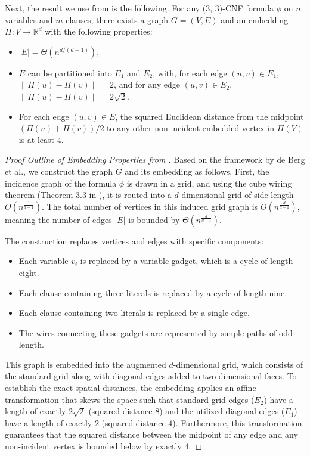 \documentclass[11pt]{article}
\begin{document}
Next, the result we use from \cite{BergBKMZ20} is the following. For any (3, 3)-CNF formula $\phi$ on $n$ variables and $m$ clauses, there exists a graph $G = (V,E)$ and an embedding $\Pi : V \rightarrow \mathbb{R}^d$ with the following properties:
\begin{itemize}
    \item $|E| = \Theta(n^{d/(d-1)})$, 
    \item $E$ can be partitioned into $E_1$ and $E_2$, with, for each edge $(u,v) \in E_1$, $\|\Pi(u) - \Pi(v)\| = 2$, and for any edge $(u, v) \in E_2$, $\|\Pi(u) - \Pi(v)\| = 2\sqrt{2}$.
    \item For each edge $(u,v) \in E$, the squared Euclidean distance from the midpoint $(\Pi(u) + \Pi(v))/2$ to any other non-incident embedded vertex in $\Pi(V)$ is at least $4$.
\end{itemize}

\begin{proof}[Proof Outline of Embedding Properties from \cite{BergBKMZ20}] 
Based on the framework by de Berg et al., we construct the graph $G$ and its embedding as follows. First, the incidence graph of the formula $\phi$ is drawn in a grid, and using the cube wiring theorem (Theorem 3.3 in \cite{BergBKMZ20}), it is routed into a $d$-dimensional grid of side length $O(n^{\frac{1}{d-1}})$. The total number of vertices in this induced grid graph is $O(n^{\frac{d}{d-1}})$, meaning the number of edges $|E|$ is bounded by $\Theta(n^{\frac{d}{d-1}})$. 

The construction replaces vertices and edges with specific components:
\begin{itemize}
    \item Each variable $v_i$ is replaced by a variable gadget, which is a cycle of length eight.
    \item Each clause containing three literals is replaced by a cycle of length nine.
    \item Each clause containing two literals is replaced by a single edge.
    \item The wires connecting these gadgets are represented by simple paths of odd length.
\end{itemize}

This graph is embedded into the augmented $d$-dimensional grid, which consists of the standard grid along with diagonal edges added to two-dimensional faces. To establish the exact spatial distances, the embedding applies an affine transformation that skews the space such that standard grid edges ($E_2$) have a length of exactly $2\sqrt{2}$ (squared distance $8$) and the utilized diagonal edges ($E_1$) have a length of exactly $2$ (squared distance $4$). Furthermore, this transformation guarantees that the squared distance between the midpoint of any edge and any non-incident vertex is bounded below by exactly $4$.
\end{proof}
\end{document}
